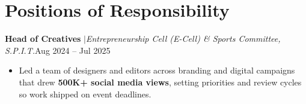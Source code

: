 \documentclass[a4paper,10pt]{article}
\newcommand{\sep}{\unskip\hspace{0.5em}$|$\hspace{0.5em}\ignorespaces}
\newlength{\entryindent}\setlength{\entryindent}{10pt}
\newcommand{\entry}[2]{\hspace*{\entryindent}#1\hfill #2\par}
\begin{document}

\section*{Positions of Responsibility}

\entry{\textbf{Head of Creatives} \sep \textit{Entrepreneurship Cell (E-Cell) \& Sports Committee, S.P.I.T.}}{Aug 2024 -- Jul 2025}
\begin{itemize}
    \item Led a team of designers and editors across branding and digital campaigns that drew \textbf{500K+ social media views}, setting priorities and review cycles so work shipped on event deadlines.
\end{itemize}
\end{document}
